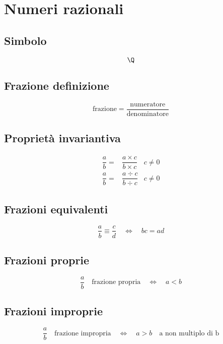 \chapter{Numeri razionali}
\section{Simbolo}
\begin{equation}
\Q
\end{equation}
\section{Frazione definizione}
\begin{equation}
\text{frazione}=\dfrac{\text{numeratore}}{\text{denominatore}}
\end{equation}
\section{Proprietà invariantiva}
\begin{align}
\dfrac{a}{b}=&\dfrac{a\times c}{b\times c}&c\neq 0\\
\dfrac{a}{b}=&\dfrac{a\div c}{b\div c}&c\neq 0
\end{align}
\section{Frazioni equivalenti}
\begin{equation}
\dfrac{a}{b}\equiv\dfrac{c}{d}\quad\Longleftrightarrow\quad bc=ad
\end{equation}
\section{Frazioni proprie}
\begin{equation}
\dfrac{a}{b}\quad\text{frazione propria}\quad\Longleftrightarrow\quad a<b
\end{equation}
\section{Frazioni improprie}
\begin{equation}
\dfrac{a}{b}\quad\text{frazione impropria}\quad\Longleftrightarrow\quad a>b\quad\text{a non multiplo di b}
\end{equation}
